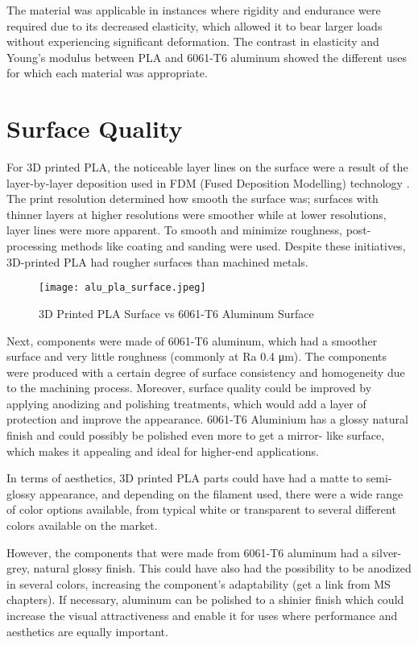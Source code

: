     The material was applicable in instances where rigidity and endurance were required due to its
    decreased elasticity, which allowed it to bear larger loads without experiencing significant deformation.
    The contrast in elasticity and Young's modulus between PLA and 6061-T6 aluminum showed the different uses for which each material was appropriate.
\section{Surface Quality}

    For 3D printed PLA, the noticeable layer lines on the surface were a result of the layer-by-layer
    deposition used in FDM (Fused Deposition Modelling) technology \cite{fusion_deposition_modeling}. The print resolution determined
    how smooth the surface was; surfaces with thinner layers at higher resolutions were smoother while at
    lower resolutions, layer lines were more apparent. To smooth and minimize roughness, post-processing
    methods like coating and sanding were used. Despite these initiatives, 3D-printed PLA had rougher
    surfaces than machined metals.

    \begin{figure}[H]
        \centering
        \texttt{[image: alu\_pla\_surface.jpeg]}
        \caption{3D Printed PLA Surface vs 6061-T6 Aluminum Surface}
        \label{fig:pla-surface}
    \end{figure}

    Next, components were made of 6061-T6 aluminum, which had a smoother surface and very little roughness
    (commonly at Ra 0.4 μm)\cite{aluminum_spec}. The components were produced with a certain degree of surface consistency
    and homogeneity due to the machining process. Moreover, surface quality could be improved by applying
    anodizing and polishing treatments, which would add a layer of protection and improve the appearance.
    6061-T6 Aluminium has a glossy natural finish and could possibly be polished even more to get a mirror-
    like surface, which makes it appealing and ideal for higher-end applications.

    In terms of aesthetics, 3D printed PLA parts could have had a matte to semi-glossy appearance, and
    depending on the filament used, there were a wide range of color options available, from typical white
    or transparent to several different colors available on the market.

    However, the components that were made from 6061-T6 aluminum had a silver-grey, natural glossy
    finish. This could have also had the possibility to be anodized in several colors, increasing the
    component's adaptability (get a link from MS chapters). If necessary, aluminum can be polished to a
    shinier finish which could increase the visual attractiveness and enable it for uses where performance
    and aesthetics are equally important.

